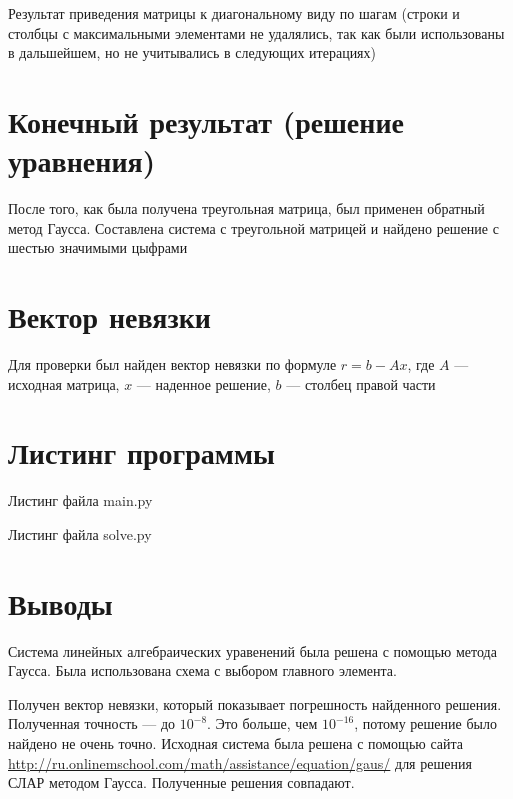 Результат приведения матрицы к диагональному виду по шагам
(строки и столбцы с максимальными элементами не удалялись, так как были использованы в дальшейшем,
но не учитывались в следующих итерациях)

\lstset{inputencoding=utf8, extendedchars=\true}


\chapter{Конечный результат (решение уравнения)}

После того, как была получена треугольная матрица, был применен обратный метод Гаусса.
Составлена система с треугольной матрицей и найдено решение с шестью значимыми цыфрами

\lstset{inputencoding=utf8, extendedchars=\true}


\chapter{Вектор невязки}

Для проверки был найден вектор невязки по формуле $r = b - Ax$, где $A$ --- исходная матрица, $x$ ---
наденное решение, $b$ --- столбец правой части

\lstset{inputencoding=utf8, extendedchars=\true}


\chapter{Листинг программы}

Листинг файла main.py
\lstset{inputencoding=utf8, extendedchars=\true}


Листинг файла solve.py
\lstset{inputencoding=utf8, extendedchars=\true}


\chapter*{Выводы}

Система линейных алгебраических уравенений была решена с помощью метода Гаусса.
Была использована схема с выбором главного элемента.

Получен вектор невязки, который показывает погрешность найденного решения.
Полученная точность --- до $10^{-8}$.
Это больше, чем $10^{-16}$, потому решение было найдено не очень точно.
Исходная система была решена с помощью сайта
\url{http://ru.onlinemschool.com/math/assistance/equation/gaus/} для решения СЛАР методом Гаусса.
Полученные решения совпадают.


